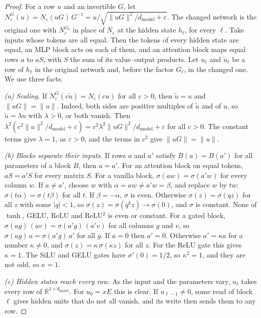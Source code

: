 \documentclass[10pt]{article}
\theoremstyle{definition}
\theoremstyle{remark}
\newcommand{\R}{\mathbb{R}}
\newcommand{\dm}{d_{\mathrm{model}}}
\newcommand{\norm}[1]{\lVert #1\rVert}
\begin{document}
\begin{proof}
For a row $u$ and an invertible $G$, let $N_\varepsilon^G(u) = N_\varepsilon(uG)\,G^{-1} = u/\sqrt{\norm{uG}^2/\dm + \varepsilon}$. The changed network is the original one with $N_\varepsilon^{G_\ell}$ in place of $N_\varepsilon$ at the hidden state $h_\ell$, for every $\ell$. Take inputs whose tokens are all equal. Then the tokens of every hidden state are equal, an MLP block acts on each of them, and an attention block maps equal rows $a$ to $aS$, with $S$ the sum of its value--output products. Let $u_\ell$ and $\tilde u_\ell$ be a row of $h_\ell$ in the original network and, before the factor $G_\ell$, in the changed one. We use three facts.

\emph{(a) Scaling.} If $N_\varepsilon^G(c\tilde u) = N_\varepsilon(cu)$ for all $c > 0$, then $\tilde u = u$ and $\norm{uG} = \norm{u}$. Indeed, both sides are positive multiples of $\tilde u$ and of $u$, so $\tilde u = \lambda u$ with $\lambda > 0$, or both vanish. Then $\lambda^2(c^2\norm{u}^2/\dm + \varepsilon) = c^2\lambda^2\norm{uG}^2/\dm + \varepsilon$ for all $c > 0$. The constant terms give $\lambda = 1$, as $\varepsilon > 0$, and the terms in $c^2$ give $\norm{uG} = \norm{u}$.

\emph{(b) Blocks separate their inputs.} If rows $a$ and $a'$ satisfy $B(a) = B(a')$ for all parameters of a block $B$, then $a = a'$. For an attention block on equal tokens, $aS = a'S$ for every matrix $S$. For a vanilla block, $\sigma(aw) = \sigma(a'w)$ for every column $w$. If $a \neq a'$, choose $w$ with $\alpha = aw \neq a'w = \beta$, and replace $w$ by $tw$: $\sigma(t\alpha) = \sigma(t\beta)$ for all $t$. If $\beta = -\alpha$, $\sigma$ is even. Otherwise $\sigma(z) = \sigma(qz)$ for all $z$ with some $\lvert q\rvert < 1$, so $\sigma(z) = \sigma(q^kz) \to \sigma(0)$, and $\sigma$ is constant. None of $\tanh$, GELU, ReLU and ReLU$^2$ is even or constant. For a gated block, $\sigma(ag)\,(av) = \sigma(a'g)\,(a'v)$ for all columns $g$ and $v$, so $\sigma(ag)\,a = \sigma(a'g)\,a'$ for all $g$. If $a = 0$ then $a' = 0$. Otherwise $a' = \kappa a$ for a number $\kappa \neq 0$, and $\sigma(z) = \kappa\,\sigma(\kappa z)$ for all $z$. For the ReLU gate this gives $\kappa = 1$. The SiLU and GELU gates have $\sigma'(0) = 1/2$, so $\kappa^2 = 1$, and they are not odd, so $\kappa = 1$.

\emph{(c) Hidden states reach every row.} As the input and the parameters vary, $u_\ell$ takes every row of $\R^{1\times\dm}$. For $u_0 = xE$ this is clear. If $u_{\ell-1} \neq 0$, some read of block $\ell$ gives hidden units that do not all vanish, and its write then sends them to any row.


\end{proof}
\end{document}
